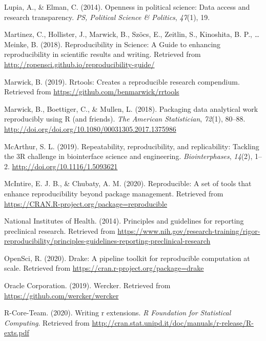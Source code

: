 \documentclass[12pt,twoside]{reedthesis}
\begin{document}
\leavevmode\hypertarget{ref-lupia2014openness}{}%
Lupia, A., \& Elman, C. (2014). Openness in political science: Data access and research transparency. \emph{PS, Political Science \& Politics}, \emph{47}(1), 19.

\leavevmode\hypertarget{ref-r-opensci}{}%
Martinez, C., Hollister, J., Marwick, B., Szöcs, E., Zeitlin, S., Kinoshita, B. P., \ldots{} Meinke, B. (2018). Reproducibility in Science: A Guide to enhancing reproducibility in scientific results and writing. Retrieved from \url{http://ropensci.github.io/reproducibility-guide/}

\leavevmode\hypertarget{ref-R-rrtools}{}%
Marwick, B. (2019). Rrtools: Creates a reproducible research compendium. Retrieved from \url{https://github.com/benmarwick/rrtools}

\leavevmode\hypertarget{ref-marwick2018packaging}{}%
Marwick, B., Boettiger, C., \& Mullen, L. (2018). Packaging data analytical work reproducibly using R (and friends). \emph{The American Statistician}, \emph{72}(1), 80--88. \url{http://doi.org/doi.org/10.1080/00031305.2017.1375986}

\leavevmode\hypertarget{ref-engineering-reproducibility}{}%
McArthur, S. L. (2019). Repeatability, reproducibility, and replicability: Tackling the 3R challenge in biointerface science and engineering. \emph{Biointerphases}, \emph{14}(2), 1--2. \url{http://doi.org/10.1116/1.5093621}

\leavevmode\hypertarget{ref-R-reproducible}{}%
McIntire, E. J. B., \& Chubaty, A. M. (2020). Reproducible: A set of tools that enhance reproducibility beyond package management. Retrieved from \url{https://CRAN.R-project.org/package=reproducible}

\leavevmode\hypertarget{ref-bio-principles}{}%
National Institutes of Health. (2014). Principles and guidelines for reporting preclinical research. Retrieved from \url{https://www.nih.gov/research-training/rigor-reproducibility/principles-guidelines-reporting-preclinical-research}

\leavevmode\hypertarget{ref-R-drake}{}%
OpenSci, R. (2020). Drake: A pipeline toolkit for reproducible computation at scale. Retrieved from \url{https://cran.r-project.org/package=drake}

\leavevmode\hypertarget{ref-wercker}{}%
Oracle Corporation. (2019). Wercker. Retrieved from \url{https://github.com/wercker/wercker}

\leavevmode\hypertarget{ref-coreteam-extensions}{}%
R-Core-Team. (2020). Writing r extensions. \emph{R Foundation for Statistical Computing}. Retrieved from \url{http://cran.stat.unipd.it/doc/manuals/r-release/R-exts.pdf}
\end{document}
